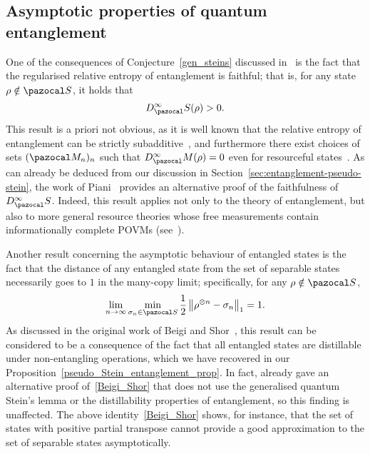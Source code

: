 \documentclass[11pt,notitlepage,tightenlines,nofootinbib,superscriptaddress]{revtex4-1}
\begin{document}
\subsection{Asymptotic properties of quantum entanglement}


One of the consequences of Conjecture~\ref{gen_steins} discussed in~\cite{Brandao2010} is the fact that the regularised relative entropy of entanglement is faithful; that is, for any state $\rho \notin \SEP$, it holds that
\begin{equation}\begin{aligned}\label{eq:relent_faithful}
D^\infty_\SEP(\rho) > 0.     
\end{aligned}\end{equation} 
This result is a priori not obvious, as it is well known that the relative entropy of entanglement can be strictly subadditive~\cite{Werner-symmetry}, and furthermore there exist choices of sets $(\MM_n)_n$ such that $D^\infty_\MM(\rho) = 0$ even for resourceful states~\cite{gour_2009}. As can already be deduced from our discussion in Section~\ref{sec:entanglement-pseudo-stein}, the work of Piani~\cite{Piani2009} provides an alternative proof of the faithfulness of $D^\infty_\SEP$. Indeed, this result applies not only to the theory of entanglement, but also to more general resource theories whose free measurements contain informationally complete POVMs (see~\cite[Theorem~1 and the subsequent discussion]{Piani2009}).


Another result concerning the asymptotic behaviour of entangled states is the fact that the distance of any entangled state from the set of separable states necessarily goes to $1$ in the many-copy limit; specifically, for any $\rho \notin \SEP$,
\begin{equation}\begin{aligned}
    \lim_{n\to\infty} \min_{\sigma_n \in \SEP} \frac12 \left\| \rho^{\otimes n} - \sigma_n \right\|_1 = 1.
    \label{Beigi_Shor}
\end{aligned}\end{equation}
As discussed in the original work of Beigi and Shor~\cite{beigi_2010}, this result can be considered to be a consequence of the fact that all entangled states are distillable under non-entangling operations, which we have recovered in our Proposition~\ref{pseudo_Stein_entanglement_prop}. In fact, \cite{beigi_2010} already gave an alternative proof of~\eqref{Beigi_Shor} that does not use the generalised quantum Stein's lemma or the distillability properties of entanglement, so this finding is unaffected. The above identity~\eqref{Beigi_Shor} shows, for instance, that the set of states with positive partial transpose cannot provide a good approximation to the set of separable states asymptotically.
\end{document}
